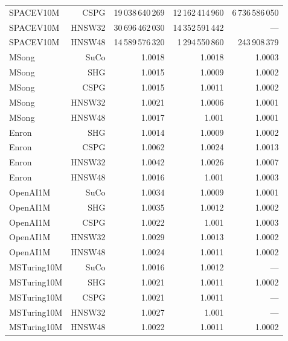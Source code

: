 \begin{table}[t]
\begin{tabular}{lrrrr}
SPACEV10M & CSPG & 19\,038\,640\,269 & 12\,162\,414\,960 & 6\,736\,586\,050 \\
SPACEV10M & HNSW32 & 30\,696\,462\,030 & 14\,352\,591\,442 & — \\
SPACEV10M & HNSW48 & 14\,589\,576\,320 & 1\,294\,550\,860 & 243\,908\,379 \\
MSong & SuCo & 1.0018 & 1.0018 & 1.0003 \\
MSong & SHG & 1.0015 & 1.0009 & 1.0002 \\
MSong & CSPG & 1.0015 & 1.0011 & 1.0002 \\
MSong & HNSW32 & 1.0021 & 1.0006 & 1.0001 \\
MSong & HNSW48 & 1.0017 & 1.001 & 1.0001 \\
Enron & SHG & 1.0014 & 1.0009 & 1.0002 \\
Enron & CSPG & 1.0062 & 1.0024 & 1.0013 \\
Enron & HNSW32 & 1.0042 & 1.0026 & 1.0007 \\
Enron & HNSW48 & 1.0016 & 1.001 & 1.0003 \\
OpenAI1M & SuCo & 1.0034 & 1.0009 & 1.0001 \\
OpenAI1M & SHG & 1.0035 & 1.0012 & 1.0002 \\
OpenAI1M & CSPG & 1.0022 & 1.001 & 1.0003 \\
OpenAI1M & HNSW32 & 1.0029 & 1.0013 & 1.0002 \\
OpenAI1M & HNSW48 & 1.0024 & 1.0011 & 1.0002 \\
MSTuring10M & SuCo & 1.0016 & 1.0012 & — \\
MSTuring10M & SHG & 1.0021 & 1.0011 & 1.0002 \\
MSTuring10M & CSPG & 1.0021 & 1.0011 & — \\
MSTuring10M & HNSW32 & 1.0027 & 1.001 & — \\
MSTuring10M & HNSW48 & 1.0022 & 1.0011 & 1.0002 \\
\bottomrule
\end{tabular}
\end{table}
